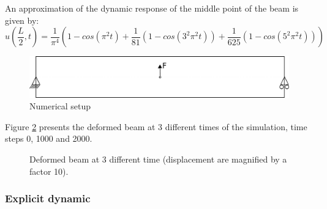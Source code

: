 \documentclass[a4paper,11pt]{book}
\begin{document}
An approximation  of the  dynamic response of  the middle  point of the  beam is
given by:
\begin{equation}\label{eqn:smm:implicit}
  u\left(\frac{L}{2}, t\right) = \frac{1}{\pi^4} \left(1 - cos\left(\pi^2 t\right) +
  \frac{1}{81}\left(1 - cos\left(3^2 \pi^2 t\right)\right) +
  \frac{1}{625}\left(1 - cos\left(5^2 \pi^2 t\right)\right)\right)
\end{equation}

\begin{figure}[!htb]
  \centering
  \includegraphics[scale=.6]{figures/implicit_dynamic}
  \caption{Numerical setup}
  \label{fig:smm:implicit:dynamic}
\end{figure}

Figure \ref{fig:smm:implicit:dynamic_solution}  presents the deformed  beam at 3
different times of the simulation, time steps 0, 1000 and 2000.

\begin{figure}[!htb]
  \centering
  \setlength{\unitlength}{0.1\textwidth}

  \caption{Deformed beam at 3 different time (displacement are
    magnified by a factor 10).}
  \label{fig:smm:implicit:dynamic_solution}
\end{figure}

\subsubsection{Explicit dynamic}
\end{document}
